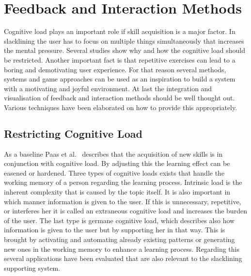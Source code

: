 \section{Feedback and Interaction Methods}\label{2_4_methods}

Cognitive load plays an important role if skill acquisition is a major factor. In slacklining the user has to focus on multiple things simultaneously that increases the mental pressure. Several studies show why and how the cognitive load should be restricted. Another important fact is that repetitive exercises can lead to a boring and demotivating user experience. For that reason several methods, systems and game approaches can be used as an inspiration to build a system with a motivating and joyful environment. At last the integration and visualisation of feedback and interaction methods should be well thought out. Various techniques have been elaborated on how to provide this appropriately.

\subsection{Restricting Cognitive Load}

As a baseline Paas et al.~\cite{Paas2003-xt} describes that the acquisition of new skills is in conjunction with cognitive load. By adjusting this the learning effect can be easened or hardened. Three types of cognitive loads exists that handle the working memory of a person regarding the learning process. Intrinsic load is the inherent complexity that is caused by the topic itself. It is also important in which manner information is given to the user. If this is unnecessary, repetitive, or interferes her it is called an extraneous cognitive load and increases the burden of the user. The last type is germane cognitive load, which describes also how information is given to the user but by supporting her in that way. This is brought by activating and automating already existing patterns or generating new ones in the working memory to enhance a learning process. Regarding this several applications have been evaluated that are also relevant to the slacklining supporting system.

